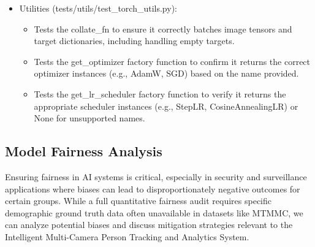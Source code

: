 \begin{itemize}
    \item Utilities (tests/utils/test\_torch\_utils.py):
    \begin{itemize}
        \item Tests the collate\_fn to ensure it correctly batches image tensors and target dictionaries, including handling empty targets.
        \item Tests the get\_optimizer factory function to confirm it returns the correct optimizer instances (e.g., AdamW, SGD) based on the name provided.
        \item Tests the get\_lr\_scheduler factory function to verify it returns the appropriate scheduler instances (e.g., StepLR, CosineAnnealingLR) or None for unsupported names.
    \end{itemize}
\end{itemize}

\subsection{Model Fairness Analysis}
\label{subsection:model_fairness_analysis}
Ensuring fairness in AI systems is critical, especially in security and surveillance applications where biases can lead to disproportionately negative outcomes for certain groups. While a full quantitative fairness audit requires specific demographic ground truth data often unavailable in datasets like MTMMC, we can analyze potential biases and discuss mitigation strategies relevant to the Intelligent Multi-Camera Person Tracking and Analytics System.


